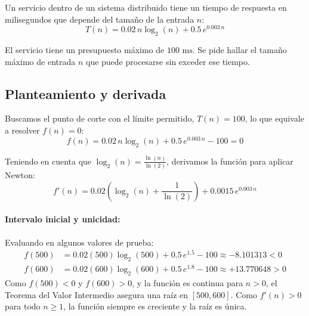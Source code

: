 \documentclass[11pt,a4paper]{article}
\begin{document}
Un servicio dentro de un sistema distribuido tiene un tiempo de respuesta en milisegundos que depende del tamaño de la entrada $n$:
\begin{equation}
    T(n) = 0.02\,n\log_2(n) + 0.5\,e^{0.003\,n}
\end{equation}

El servicio tiene un presupuesto máximo de $100\text{ ms}$. Se pide hallar el tamaño máximo de entrada $n$ que puede procesarse sin exceder ese tiempo.

\subsection{Planteamiento y derivada}
Buscamos el punto de corte con el límite permitido, $T(n) = 100$, lo que equivale a resolver $f(n) = 0$:
\begin{equation}
    f(n) = 0.02\,n\log_2(n) + 0.5\,e^{0.003\,n} - 100 = 0
\end{equation}

Teniendo en cuenta que $\log_2(n) = \frac{\ln(n)}{\ln(2)}$, derivamos la función para aplicar Newton:
\begin{equation}
    f'(n) = 0.02\left(\log_2(n) + \frac{1}{\ln(2)}\right) + 0.0015\,e^{0.003\,n}
\end{equation}

\paragraph{Intervalo inicial y unicidad:}
Evaluando en algunos valores de prueba:
\begin{align*}
    f(500) &= 0.02(500)\log_2(500) + 0.5\,e^{1.5} - 100 \approx -8.101313 < 0 \\
    f(600) &= 0.02(600)\log_2(600) + 0.5\,e^{1.8} - 100 \approx +13.770648 > 0
\end{align*}
Como $f(500) < 0$ y $f(600) > 0$, y la función es continua para $n > 0$, el Teorema del Valor Intermedio asegura una raíz en $[500, 600]$. Como $f'(n) > 0$ para todo $n \ge 1$, la función siempre es creciente y la raíz es única.
\end{document}

